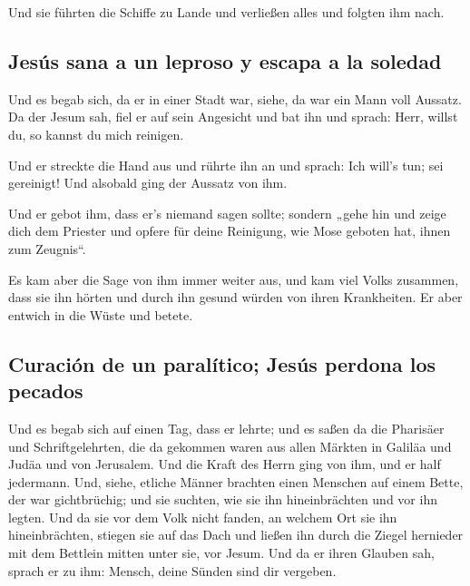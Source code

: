  Und sie führten die Schiffe zu Lande und verließen alles
und folgten ihm nach.

\hypertarget{jesuxfas-sana-a-un-leproso-y-escapa-a-la-soledad}{%
\subsection{Jesús sana a un leproso y escapa a la
soledad}\label{jesuxfas-sana-a-un-leproso-y-escapa-a-la-soledad}}

 Und es begab sich, da er in einer Stadt war, siehe, da
war ein Mann voll Aussatz. Da der Jesum sah, fiel er auf sein Angesicht
und bat ihn und sprach: Herr, willst du, so kannst du mich reinigen.

 Und er streckte die Hand aus und rührte ihn an und
sprach: Ich will's tun; sei gereinigt! Und alsobald ging der Aussatz von
ihm.

 Und er gebot ihm, dass er's niemand sagen sollte;
sondern „gehe hin und zeige dich dem Priester und opfere für deine
Reinigung, wie Mose geboten hat, ihnen zum Zeugnis``.

 Es kam aber die Sage von ihm immer weiter aus, und kam
viel Volks zusammen, dass sie ihn hörten und durch ihn gesund würden von
ihren Krankheiten.  Er aber entwich in die Wüste und
betete.

\hypertarget{curaciuxf3n-de-un-paraluxedtico-jesuxfas-perdona-los-pecados}{%
\subsection{Curación de un paralítico; Jesús perdona los
pecados}\label{curaciuxf3n-de-un-paraluxedtico-jesuxfas-perdona-los-pecados}}

 Und es begab sich auf einen Tag, dass er lehrte; und es
saßen da die Pharisäer und Schriftgelehrten, die da gekommen waren aus
allen Märkten in Galiläa und Judäa und von Jerusalem. Und die Kraft des
Herrn ging von ihm, und er half jedermann.  Und, siehe,
etliche Männer brachten einen Menschen auf einem Bette, der war
gichtbrüchig; und sie suchten, wie sie ihn hineinbrächten und vor ihn
legten.  Und da sie vor dem Volk nicht fanden, an welchem
Ort sie ihn hineinbrächten, stiegen sie auf das Dach und ließen ihn
durch die Ziegel hernieder mit dem Bettlein mitten unter sie, vor Jesum.
 Und da er ihren Glauben sah, sprach er zu ihm: Mensch,
deine Sünden sind dir vergeben.


